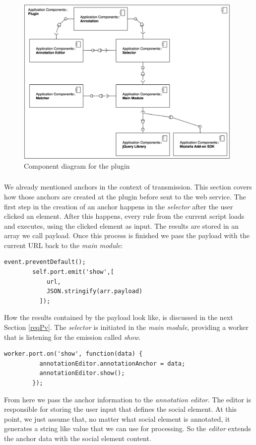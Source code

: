 \begin{figure}
	\includegraphics[width=11cm]{images/component-plugin-diagram.png}
	\caption{Component diagram for the plugin}
	\label{component-plugin-diagram}
\end{figure}

\subsubsection[Creating Anchors]{\reqPiv}\label{reqPiv}
We already mentioned anchors in the context of transmission. This section covers how those anchors are created at the plugin before sent to the web service. 
The first step in the creation of an anchor happens in the \emph{selector} after the user clicked an element. After this happens, every rule from the current script loads and executes, using the clicked element as input. The results are stored in an array we call payload. Once this process is finished we pass the payload with the current URL back to the \emph{main module}:

\begin{lstlisting}
event.preventDefault();    
        self.port.emit('show',[
            url,
            JSON.stringify(arr.payload)
          ]);
\end{lstlisting}
How the results contained by the payload look like, is discussed in the next Section \ref{reqPv}. 
The \textit{selector} is initiated in the \textit{main module}, providing a worker that is listening for the emission called \textit{show}. 
\begin{lstlisting}
worker.port.on('show', function(data) {
          annotationEditor.annotationAnchor = data;
          annotationEditor.show();
        });
\end{lstlisting}
From here we pass the anchor information to the \textit{annotation editor}. The editor is responsible for storing the user input that defines the social element. At this point, we just assume that, no matter what social element is annotated, it generates a string like value that we can use for processing. So the \textit{editor} extends the anchor data with the social element content. 

